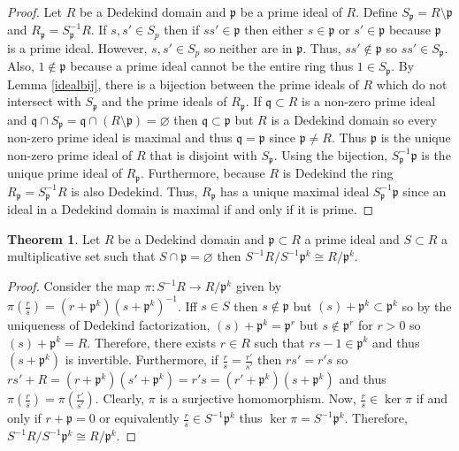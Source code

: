\documentclass[12pt]{extarticle}
\newcommand{\sm}{\! \setminus \!}
\theoremstyle{definition}
\newtheorem{theorem}{Theorem}[section]
\begin{document}
\begin{proof}
Let $R$ be a Dedekind domain and $\mathfrak{p}$ be a prime ideal of $R$. Define $S_\mathfrak{p} = R \sm \mathfrak{p}$ and $R_\mathfrak{p} = S_\mathfrak{p}^{-1}R$. If $s, s' \in S_p$ then if $ss' \in \mathfrak{p}$ then either $s \in \mathfrak{p}$ or $s' \in \mathfrak{p}$ because $\mathfrak{p}$ is a prime ideal. However, $s, s' \in S_p$ so neither are in $\mathfrak{p}$. Thus, $ss' \notin \mathfrak{p}$ so $ss' \in S_\mathfrak{p}$. Also, $1 \notin \mathfrak{p}$ because a prime ideal cannot be the entire ring thus $1 \in S_\mathfrak{p}$. By Lemma \ref{idealbij}, there is a bijection between the prime ideals of $R$ which do not intersect with $S_\mathfrak{p}$ and the prime ideals of $R_\mathfrak{p}$. If $\mathfrak{q} \subset R$ is a non-zero prime ideal and $\mathfrak{q} \cap S_\mathfrak{p} = \mathfrak{q} \cap (R \sm \mathfrak{p}) = \varnothing$ then $\mathfrak{q} \subset \mathfrak{p}$ but $R$ is a Dedekind domain so every non-zero prime ideal is maximal and thus $\mathfrak{q} = \mathfrak{p}$ since $\mathfrak{p} \neq R$. Thus $\mathfrak{p}$ is the unique non-zero prime ideal of $R$ that is disjoint with $S_\mathfrak{p}$. Using the bijection, $S_\mathfrak{p}^{-1} \mathfrak{p}$ is the unique prime ideal of $R_\mathfrak{p}$. Furthermore, because $R$ is Dedekind the ring $R_\mathfrak{p} = S_\mathfrak{p}^{-1} R$ is also Dedekind. Thus, $R_\mathfrak{p}$ has a unique maximal ideal $S_\mathfrak{p}^{-1} \mathfrak{p}$ since an ideal in a Dedekind domain is maximal if and only if it is prime.  
\end{proof}

\begin{theorem} \label{locfield}
Let $R$ be a Dedekind domain and $\mathfrak{p} \subset R$ a prime ideal and $S \subset R$ a multiplicative set such that $S \cap \mathfrak{p} = \varnothing$ then $S^{-1} R / S^{-1} \mathfrak{p}^k \cong R / \mathfrak{p}^k$.
\end{theorem}

\begin{proof}
Consider the map $\pi : S^{-1} R \to R/ \mathfrak{p}^k$ given by $\pi\left(\frac{r}{s}\right) = (r + \mathfrak{p}^k)(s + \mathfrak{p}^k)^{-1}$. Iff $s \in S$ then $s \notin \mathfrak{p}$ but $(s) + \mathfrak{p}^k \subset \mathfrak{p}^k$ so by the uniqueness of Dedekind factorization, $(s) + \mathfrak{p}^k = \mathfrak{p}^r$ but $s \notin \mathfrak{p}^r$ for $r > 0$ so $(s) + \mathfrak{p}^k = R$. Therefore, there exists $r \in R$ such that $rs - 1 \in \mathfrak{p}^k$ and thus $(s + \mathfrak{p}^k)$ is invertible. Furthermore, if $\frac{r}{s} = \frac{r'}{s'}$ then $rs' = r's$ so $rs' + R = (r + \mathfrak{p}^k)(s' + \mathfrak{p}^k) = r's = (r' + \mathfrak{p}^k)(s + \mathfrak{p}^k)$ and thus $\pi\left(\frac{r}{s}\right) = \pi\left(\frac{r'}{s'}\right)$. Clearly, $\pi$ is a surjective homomorphism. Now, $\frac{r}{s} \in \ker{\pi}$ if and only if $r + \mathfrak{p} = 0$ or equivalently $\frac{r}{s} \in S^{-1} \mathfrak{p}^k$ thus $\ker{\pi} = S^{-1} \mathfrak{p}^k$. Therefore, $S^{-1} R / S^{-1} \mathfrak{p}^k \cong R / \mathfrak{p}^k$.
\end{proof}
\end{document}
